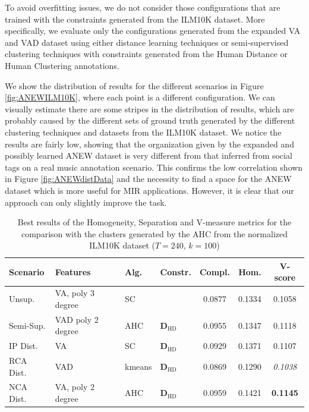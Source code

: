 To avoid overfitting issues, we do not consider those configurations that are trained with the constraints generated from the ILM10K dataset. More specifically, we evaluate only the configurations generated from the expanded VA and VAD dataset using either distance learning techniques or semi-supervised clustering techniques with constraints generated from the Human Distance or Human Clustering annotations.


We show the distribution of results for the different scenarios in Figure \ref{fig:ANEWILM10K}, where each point is a different configuration. We can visually estimate there are some stripes in the distribution of results, which are probably caused by the different sets of ground truth generated by the different clustering techniques and datasets from the ILM10K dataset. 
We notice the results are fairly low, showing that the organization given by the expanded and possibly learned ANEW dataset is very different from that inferred from social tags on a real music annotation scenario. This confirms the low correlation shown in Figure \ref{fig:ANEWdistData} and the necessity to find a space for the ANEW dataset which is more useful for MIR applications. However, it is clear that our approach can only slightly improve the task. 


\begin{table}[tbp]
	\caption{Best results of the Homogeneity, Separation and V-measure metrics for the comparison with the clusters generated by the AHC from the normalized ILM10K dataset ($T=240$, $k=100$)}
	\label{tab:ANEWv_score}
    \small
\begin{center}
  \bgroup
  \def\arraystretch{1.5}
\begin{tabular}{ ||l  |l| l |l  |c|c|c ||}
\hline
\hline
Scenario    & Features    &  Alg.   & Constr.   & Compl.  & Hom.  & V-score \\
\hline
\hline
Unsup.  & VA, poly 3 degree & SC &  &  0.0877 & 0.1334 & 0.1058 \\
\hline
Semi-Sup. & VAD poly 2 degree & AHC     & $\mathbf{{D}}_{\text{HD}}$   & 0.0955 & 0.1347 & 0.1118 \\
\hline
IP Dist. & VA       & SC    & $\mathbf{{D}}_{\text{HD}}$     & 0.0929 & 0.1371 & 0.1107 \\
\hline
RCA Dist. & VAD & kmeans & $\mathbf{{D}}_{\text{HD}}$ & 0.0869 & 0.1290 & {\color[HTML]{8E0000} \textit{0.1038}} \\
\hline
NCA Dist.& VA, poly 2 degree & AHC & $\mathbf{{D}}_{\text{HD}}$   & 0.0959 & 0.1421 & {\color[HTML]{326B00} \textbf{0.1145}}  \\
\hline
\hline
\end{tabular}
\egroup
\end{center}
\end{table}

